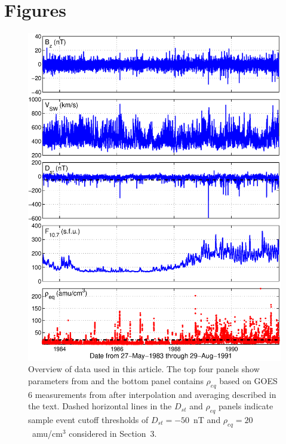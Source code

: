 \documentclass[12pt]{article}
\begin{document}
\clearpage

\section{Figures}

\begin{figure}[htp!]
\centering
\includegraphics[scale=0.45]{figures/alldata-GOES6-1983-1991.eps}
\caption{Overview of data used in this article. The top four panels show parameters from \cite{Kondrashov2014ReconstructionOfGaps} and the bottom panel contains $\rho_{eq}$ based on GOES 6 measurements from \cite{Denton} after interpolation and averaging described in the text. Dashed horizontal lines in the $D_{st}$ and $\rho_{eq}$ panels indicate sample event cutoff thresholds of $D_{st} = -50$~nT and $\rho_{eq} = 20$~amu/cm$^3$ considered in Section~3.}
\label{fig:AllData}
\end{figure}

\clearpage
\end{document}
